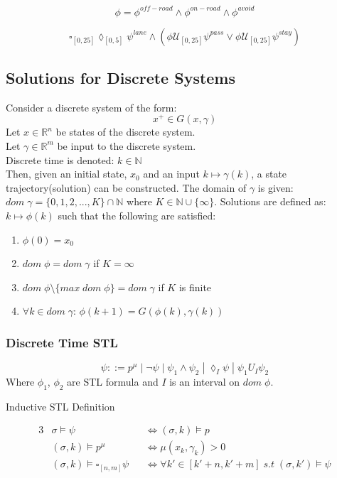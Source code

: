 \documentclass{article}
\theoremstyle{definition}
\begin{document}
\begin{equation}
    \phi = \phi^{off-road} \land \phi^{on-road} \land \phi^{avoid} 
\end{equation}

\begin{equation}
    \square_{[0,25]}\lozenge_{[0,5]}\psi^{lane} \land (\phi\mathcal{U}_{[0,25]}\psi^{pass} \lor \phi\mathcal{U}_{[0,25]}\psi^{stay})
\end{equation}


\subsection{Solutions for Discrete Systems}
Consider a discrete system of the form:
\begin{equation}
    x^{+} \in G(x,\gamma)
\end{equation}
Let $x \in \mathbb{R}^n$ be states of the discrete system.\\
Let $\gamma \in \mathbb{R}^m$ be input to the discrete system. \\
Discrete time is denoted: $k \in \mathbb{N}$\\
Then, given an initial state, $x_0$ and an input $k \mapsto \gamma(k)$, a state trajectory(solution)
can be constructed. The domain of $\gamma$ is given: $dom\;\gamma = \{0,1,2,...,K\}\cap \mathbb{N}$ where $K \in \mathbb{N} \cup \{\infty\}$. Solutions are defined as: $k \mapsto \phi(k)$ such that the following are satisfied:
\begin{enumerate}
    \item $\phi(0) = x_0$
    \item $dom\;\phi = dom\;\gamma$ if $K=\infty$
    \item $dom\;\phi \setminus \{max\; dom\;\phi\} = dom\;\gamma$ if $K$ is finite
    \item $\forall k \in dom\;\gamma$: $\phi(k+1) = G(\phi(k),\gamma(k))$
\end{enumerate}
\subsubsection{Discrete Time STL}
\begin{equation}
    \psi ::= p^\mu\;|\;\lnot \psi\;|\;\psi_1 \land \psi_2\;|\;\lozenge_{I} \psi\;|\;\psi_1 U_{I} \psi_2
\end{equation}
Where $\phi_1$, $\phi_2$ are STL formula and $I$ is an interval on $dom\;\phi$.

\begin{center}
    Inductive STL Definition
\end{center}
\begin{alignat*}{3}
            &\sigma \models \psi &&\Leftrightarrow (\sigma, k) \models p \\
            &(\sigma, k) \models p^\mu \quad &&\Leftrightarrow \mu(x_k, \gamma_k) > 0\\
            &(\sigma, k) \models \square_{[n,m]} \psi &&\Leftrightarrow \forall k' \in [k' + n, k' + m]\;s.t\;(\sigma, k') \models \psi
\end{alignat*}






\end{document}
